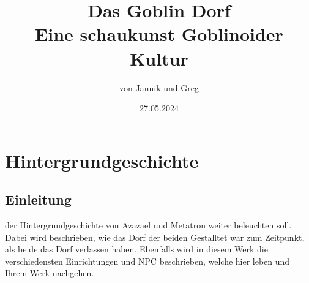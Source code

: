 \documentclass[letterpaper,twocolumn,openany,nodeprecatedcode]{book}
\title{Das Goblin Dorf\\
\large Eine schaukunst Goblinoider Kultur}
\author{von Jannik und Greg}
\date{27.05.2024}
\begin{document}
\frontmatter

\maketitle

\tableofcontents

\mainmatter%

\part{Hintergrundgeschichte}

\chapter{Einleitung}

 der Hintergrundgeschichte von Azazael und Metatron weiter beleuchten soll. Dabei wird beschrieben, wie das Dorf der beiden Gestalltet war zum Zeitpunkt, als beide das Dorf verlassen haben. Ebenfalls wird in diesem Werk die verschiedensten Einrichtungen und NPC beschrieben, welche hier leben und Ihrem Werk nachgehen.
\end{document}
